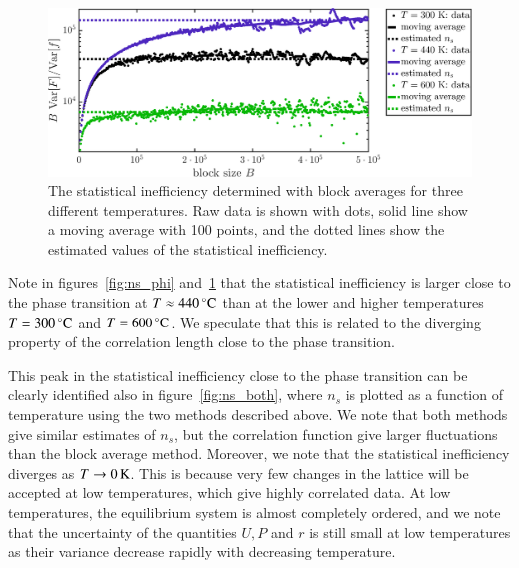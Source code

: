 \begin{figure}[!ht]
\begin{center}
  \includegraphics[width=\textwidth]{../figures/stat_inefficiency_block} 
  \caption{The statistical inefficiency determined with block averages for three different temperatures. Raw data is shown with dots, solid line show a moving average with 100 points, and the dotted lines show the estimated values of the statistical inefficiency.}
  \label{fig:ns_block}
\end{center}
\end{figure}

Note in figures~\ref{fig:ns_phi} and~\ref{fig:ns_block} that the statistical inefficiency is larger close to the phase transition at $T \approx \unit[440]{^\circ C}$ than at the lower and higher temperatures  $T = \unit[300]{^\circ C}$ and $T = \unit[600]{^\circ C}$. We speculate that this is related to the diverging property of the correlation length close to the phase transition. 

This peak in the statistical inefficiency close to the phase transition can be clearly identified also in figure~\ref{fig:ns_both}, where $n_s$ is plotted as a function of temperature using the two methods described above. We note that both methods give similar estimates of $n_s$, but the correlation function give larger fluctuations than the block average method. Moreover, we note that the statistical inefficiency diverges as $T \rightarrow \unit[0]{K}$. This is because very few changes in the lattice will be accepted at low temperatures, which give highly correlated data. At low temperatures, the equilibrium system is almost completely ordered, and we note that the uncertainty of the quantities $U, P$ and $r$ is still small at low temperatures as their variance decrease rapidly with decreasing temperature. 

